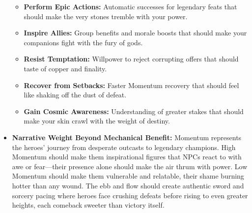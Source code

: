 \documentclass[11pt]{article}
\begin{document}
\begin{itemize}
\begin{itemize}
  \item \textbf{Perform Epic Actions:} Automatic successes for legendary feats that should make the very stones tremble with your power.
  \item \textbf{Inspire Allies:} Group benefits and morale boosts that should make your companions fight with the fury of gods.
  \item \textbf{Resist Temptation:} Willpower to reject corrupting offers that should taste of copper and finality.
  \item \textbf{Recover from Setbacks:} Faster Momentum recovery that should feel like shaking off the dust of defeat.
  \item \textbf{Gain Cosmic Awareness:} Understanding of greater stakes that should make your skin crawl with the weight of destiny.
  \end{itemize}
\item \textbf{Narrative Weight Beyond Mechanical Benefit:} Momentum represents the heroes' journey from desperate outcasts to legendary champions. High Momentum should make them inspirational figures that NPCs react to with awe or fear—their presence alone should make the air thrum with power. Low Momentum should make them vulnerable and relatable, their shame burning hotter than any wound. The ebb and flow should create authentic sword and sorcery pacing where heroes face crushing defeats before rising to even greater heights, each comeback sweeter than victory itself.
\end{itemize}
\end{document}
